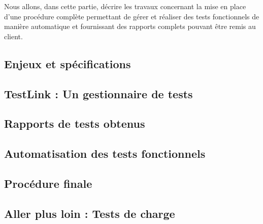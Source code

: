 	Nous allons, dans cette partie, décrire les travaux concernant la mise en place d'une procédure complète permettant de gérer et réaliser des tests fonctionnels de manière automatique et fournissant des rapports complets pouvant être remis au client.

\subsection{Enjeux et spécifications}
	

\subsection{TestLink : Un gestionnaire de tests}
	
	
\subsection{Rapports de tests obtenus}
	

\subsection{Automatisation des tests fonctionnels}
	
		
\subsection{Procédure finale}
	
	
\subsection{Aller plus loin : Tests de charge}
	